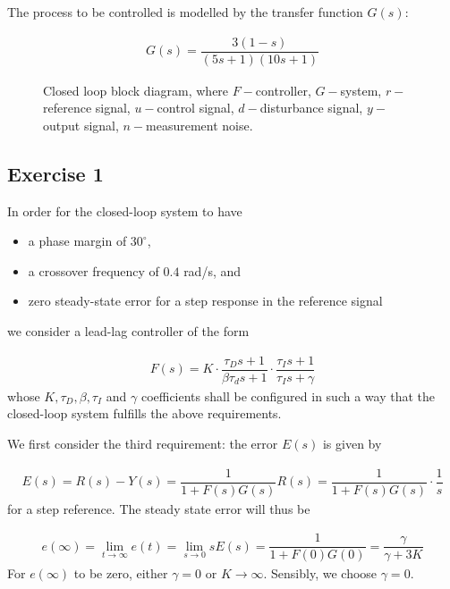 The process to be controlled is modelled by the transfer function $G(s)$:

\begin{align*}
  G(s) = \dfrac{3(1-s)}{(5s + 1)(10s + 1)}
\end{align*}


\begin{figure}[H]\centering
  \scalebox{1}{}
  \caption{Closed loop block diagram, where $F-$controller, $G-$system,
    $r-$reference signal, $u-$control signal, $d-$disturbance signal, $y-$output
    signal, $n-$measurement noise.}
  \label{fig:block_1}
\end{figure}


\subsection{Exercise 1}

In order for the closed-loop system to have

\begin{itemize}
  \item a phase margin of $30^{\circ}$,
  \item a crossover frequency of $0.4$ rad/s, and
  \item zero steady-state error for a step response in the reference signal
\end{itemize}
we consider a lead-lag controller of the form

\begin{align*}
  F(s) = K \cdot \dfrac{\tau_D s + 1}{\beta \tau_d s + 1} \cdot \dfrac{\tau_I s + 1}{\tau_I s + \gamma}
\end{align*}
whose $K, \tau_D, \beta, \tau_I$ and $\gamma$ coefficients shall be configured
in such a way that the closed-loop system fulfills the above requirements.

We first consider the third requirement: the error $E(s)$ is given by

\begin{align*}
  E(s) = R(s) - Y(s) = \dfrac{1}{1 + F(s)G(s)} R(s) = \dfrac{1}{1 + F(s)G(s)} \cdot \dfrac{1}{s}
\end{align*}
for a step reference. The steady state error will thus be

\begin{align*}
  e(\infty) = \displaystyle\lim_{t\to \infty} e(t) = \displaystyle\lim_{s\to 0} sE(s) = \dfrac{1}{1 + F(0)G(0)} = \dfrac{\gamma}{\gamma + 3K}
\end{align*}
For $e(\infty)$ to be zero, either $\gamma = 0$ or $K \to \infty$. Sensibly, we
choose $\gamma = 0$.


